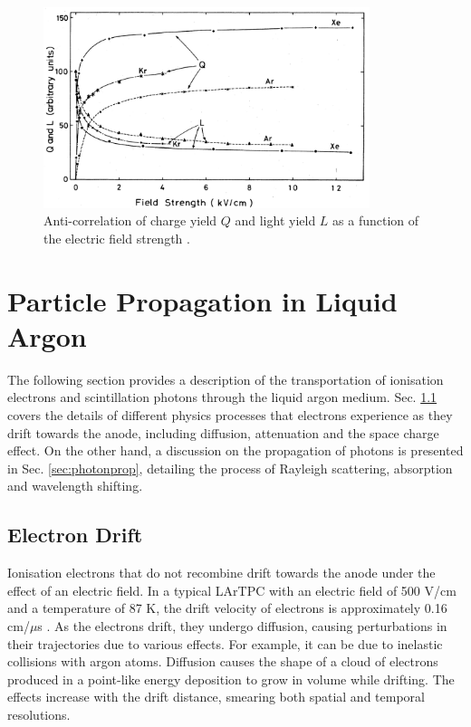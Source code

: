 \begin{figure}[ht!] 
\centering    
\includegraphics[width=0.85\textwidth]{QLAnti}
\caption[Charge and Light Yield as a Function of Electric Field]{
Anti-correlation of charge yield $Q$ and light yield $L$ as a function of the electric field strength \cite{QLAnti}.
}
\label{fig:QLAnti}
\end{figure}

\section{Particle Propagation in Liquid Argon}
\label{sec3:propagation}

The following section provides a description of the transportation of ionisation electrons and scintillation photons through the liquid argon medium.
Sec. \ref{sec:edrift} covers the details of different physics processes that electrons experience as they drift towards the anode, including diffusion, attenuation and the space charge effect.
On the other hand, a discussion on the propagation of photons is presented in Sec. \ref{sec:photonprop}, detailing the process of Rayleigh scattering, absorption and wavelength shifting.

\subsection{Electron Drift}
\label{sec:edrift}


Ionisation electrons that do not recombine drift towards the anode under the effect of an electric field.
In a typical LArTPC with an electric field of 500 V/cm and a temperature of 87 K, the drift velocity of electrons is approximately 0.16 cm/$\mu$s \cite{drift_vel}.
As the electrons drift, they undergo diffusion, causing perturbations in their trajectories due to various effects.
For example, it can be due to inelastic collisions with argon atoms.
Diffusion causes the shape of a cloud of electrons produced in a point-like energy deposition to grow in volume while drifting.
The effects increase with the drift distance, smearing both spatial and temporal resolutions. 

